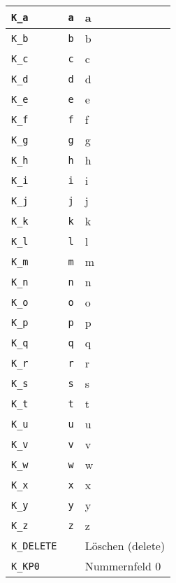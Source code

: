 \begin{longtable}{lll}
\texttt{K\_a}            &  \verb+a+     &  a\\ \hline
\texttt{K\_b}            &  \verb+b+     &  b\\ \hline
\texttt{K\_c}            &  \verb+c+     &  c\\ \hline
\texttt{K\_d}            &  \verb+d+     &  d\\ \hline
\texttt{K\_e}            &  \verb+e+     &  e\\ \hline
\texttt{K\_f}            &  \verb+f+     &  f\\ \hline
\texttt{K\_g}            &  \verb+g+     &  g\\ \hline
\texttt{K\_h}            &  \verb+h+     &  h\\ \hline
\texttt{K\_i}            &  \verb+i+     &  i\\ \hline
\texttt{K\_j}            &  \verb+j+     &  j\\ \hline
\texttt{K\_k}            &  \verb+k+     &  k\\ \hline
\texttt{K\_l}            &  \verb+l+     &  l\\ \hline
\texttt{K\_m}            &  \verb+m+     &  m\\ \hline
\texttt{K\_n}            &  \verb+n+     &  n\\ \hline
\texttt{K\_o}            &  \verb+o+     &  o\\ \hline
\texttt{K\_p}            &  \verb+p+     &  p\\ \hline
\texttt{K\_q}            &  \verb+q+     &  q\\ \hline
\texttt{K\_r}            &  \verb+r+     &  r\\ \hline
\texttt{K\_s}            &  \verb+s+     &  s\\ \hline
\texttt{K\_t}            &  \verb+t+     &  t\\ \hline
\texttt{K\_u}            &  \verb+u+     &  u\\ \hline
\texttt{K\_v}            &  \verb+v+     &  v\\ \hline
\texttt{K\_w}            &  \verb+w+     &  w\\ \hline
\texttt{K\_x}            &  \verb+x+     &  x\\ \hline
\texttt{K\_y}            &  \verb+y+     &  y\\ \hline
\texttt{K\_z}            &  \verb+z+     &  z\\ \hline
\texttt{K\_DELETE}       &  \verb+ +     &  Löschen (delete)\\ \hline
\texttt{K\_KP0}          &  \verb+ +     &  Nummernfeld 0\\ \hline

\end{longtable}
